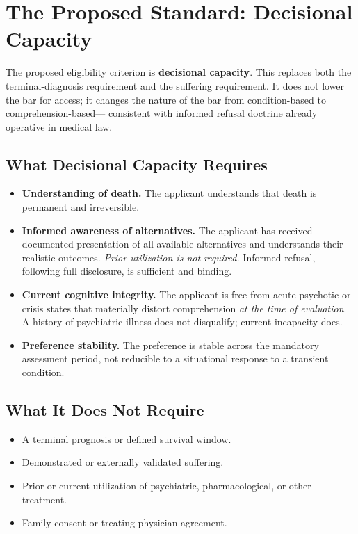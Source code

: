 \documentclass[11pt, letterpaper]{article}
\begin{document}
\section{The Proposed Standard: Decisional Capacity}

The proposed eligibility criterion is \textbf{decisional capacity}. This replaces both the
terminal-diagnosis requirement and the suffering requirement. It does not lower the bar for
access; it changes the nature of the bar from condition-based to comprehension-based---
consistent with informed refusal doctrine already operative in medical law.

\subsection{What Decisional Capacity Requires}

\begin{itemize}
  \item \textbf{Understanding of death.} The applicant understands that death is permanent
    and irreversible.
  \item \textbf{Informed awareness of alternatives.} The applicant has received documented
    presentation of all available alternatives and understands their realistic outcomes.
    \emph{Prior utilization is not required.} Informed refusal, following full disclosure,
    is sufficient and binding.
  \item \textbf{Current cognitive integrity.} The applicant is free from acute psychotic or
    crisis states that materially distort comprehension \emph{at the time of evaluation}.
    A history of psychiatric illness does not disqualify; current incapacity does.
  \item \textbf{Preference stability.} The preference is stable across the mandatory
    assessment period, not reducible to a situational response to a transient condition.
\end{itemize}

\subsection{What It Does Not Require}

\begin{itemize}
  \item A terminal prognosis or defined survival window.
  \item Demonstrated or externally validated suffering.
  \item Prior or current utilization of psychiatric, pharmacological, or other treatment.
  \item Family consent or treating physician agreement.
\end{itemize}
\end{document}
